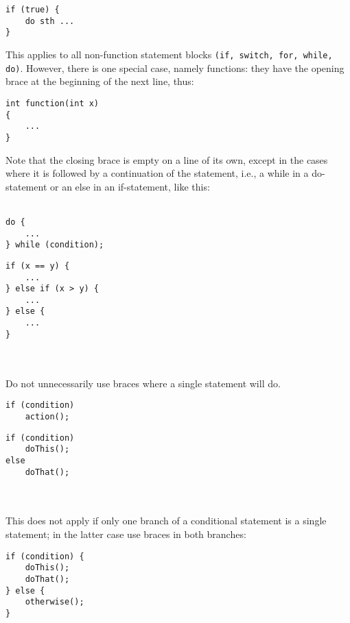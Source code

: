 \documentclass[11pt]{article}
\begin{document}
\begin{Verbatim}
if (true) {
	do sth ...
}
\end{Verbatim}
This applies to all non-function statement blocks \texttt{(if, switch, for, while, do)}. However, there is one special case, namely functions: they have the opening brace at the beginning of the next line, thus:

\begin{Verbatim}
int function(int x)
{
	...
}
\end{Verbatim}

Note that the closing brace is empty on a line of its own, except in the cases where it is followed by a continuation of the statement, i.e., a while in a do-statement or an else in an if-statement, like this:
\\\\
\begin{minipage}[t]{0.5\textwidth}
\begin{Verbatim}
do {
	...
} while (condition);
\end{Verbatim}
\end{minipage}
\begin{minipage}[t]{0.5\textwidth}
\begin{Verbatim}
if (x == y) {
	...
} else if (x > y) {
	...
} else {
	...
}
\end{Verbatim}
\end{minipage}
\\\\
Do not unnecessarily use braces where a single statement will do.

\begin{minipage}[t]{0.5\textwidth}
\begin{Verbatim}
if (condition)
	action();
\end{Verbatim}
\end{minipage}

\begin{minipage}[t]{0.5\textwidth}
\begin{Verbatim}
if (condition)
	doThis();
else
	doThat();	
\end{Verbatim}
\end{minipage}
\\\\
This does not apply if only one branch of a conditional statement is a single statement; in the latter case use braces in both branches:

\begin{Verbatim}
if (condition) {
	doThis();
	doThat();
} else {
	otherwise();
}	
\end{Verbatim}
\end{document}
